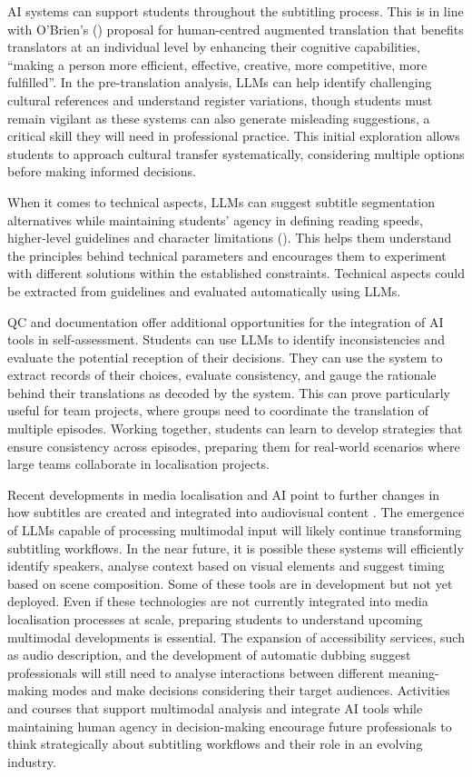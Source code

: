 \documentclass[output=paper]{langscibook}
\begin{document}
AI systems can support students throughout the subtitling process. This is in line with O’Brien’s (\citeyear[402]{obrien_human-centered_2024}) proposal for human-centred augmented translation that benefits translators at an individual level by enhancing their cognitive capabilities, “making a person more efficient, effective, creative, more competitive, more fulfilled”. In the pre-translation analysis, LLMs can help identify challenging cultural references and understand register variations, though students must remain vigilant as these systems can also generate misleading suggestions, a critical skill they will need in professional practice. This initial exploration allows students to approach cultural transfer systematically, considering multiple options before making informed decisions.

When it comes to technical aspects, LLMs can suggest subtitle segmentation alternatives while maintaining students’ agency in defining reading speeds, higher-level guidelines and character limitations (\citealt{szarkowska2024introducing}). This helps them understand the principles behind technical parameters and encourages them to experiment with different solutions within the established constraints. Technical aspects could be extracted from guidelines and evaluated automatically using LLMs.

QC and documentation offer additional opportunities for the integration of AI tools in self-assessment. Students can use LLMs to identify inconsistencies and evaluate the potential reception of their decisions. They can use the system to extract records of their choices, evaluate consistency, and gauge the rationale behind their translations as decoded by the system. This can prove particularly useful for team projects, where groups need to coordinate the translation of multiple episodes. Working together, students can learn to develop strategies that ensure consistency across episodes, preparing them for real-world scenarios where large teams collaborate in localisation projects.

Recent developments in media localisation and AI point to further changes in how subtitles are created and integrated into audiovisual content \citep{slator2024proguide}. The emergence of LLMs capable of processing multimodal input will likely continue transforming subtitling workflows. In the near future, it is possible these systems will efficiently identify speakers, analyse context based on visual elements and suggest timing based on scene composition. Some of these tools are in development but not yet deployed. Even if these technologies are not currently integrated into media localisation processes at scale, preparing students to understand upcoming multimodal developments is essential. The expansion of accessibility services, such as audio description, and the development of automatic dubbing suggest professionals will still need to analyse interactions between different meaning-making modes and make decisions considering their target audiences. Activities and courses that support multimodal analysis and integrate AI tools while maintaining human agency in decision-making encourage future professionals to think strategically about subtitling workflows and their role in an evolving industry.
\end{document}

